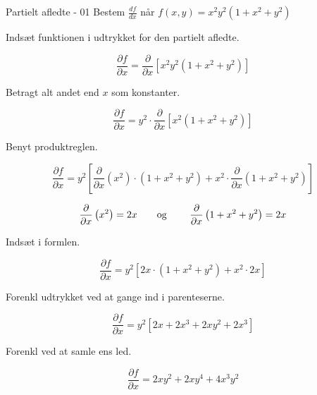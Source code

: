 \documentclass{article}
\begin{document}
\tableofcontents
\newpage

\begin{exercise}{Partielt afledte - 01}
Bestem $\frac{df}{dx}$ når $f(x,y) = x^2y^2\left(1+x^2+y^2\right)$ 


\hint
Indsæt funktionen i udtrykket for den partielt afledte.

\hint

\[
\frac{\partial f}{\partial x} = \frac{\partial }{\partial x} \left[ x^2y^2\left(1+x^2+y^2 \right)\right]
\]

\hint
Betragt alt andet end $x$ som konstanter.

\hint
\[
\frac{\partial f}{\partial x} = y^2 \cdot \frac{\partial }{\partial x} \left[ x^2\left(1+x^2+y^2 \right) \right]
\]

\hint

Benyt produktreglen.

\hint
\[
\frac{\partial f}{\partial x} = y^2\left[\frac{\partial }{\partial x}\left(x^2 \right) \cdot \left( 1+x^2+y^2 \right) + x^2 \cdot \frac{\partial}{\partial x} \left( 1+x^2+y^2\right) \right]
\]

\hint
\[\frac{\partial }{\partial x} \left(x^2\right) = 2x \textrm{\qquad og \qquad} \frac{\partial }{\partial x} \left(1+x^2+y^2\right) = 2x
\]

\hint
Indsæt i formlen.

\hint
\[
\frac{\partial f}{\partial x} = y^2\left[2x \cdot \left( 1+x^2+y^2 \right) + x^2 \cdot 2x \right]
\]

\hint
Forenkl udtrykket ved at gange ind i parenteserne.

\hint
\[
\frac{\partial f}{\partial x} = y^2 \left[ 2x+2x^3+2xy^2 + 2x^3 \right]
\]

\hint Forenkl ved at samle ens led.

\hint
\[
\frac{\partial f}{\partial x} = 2xy^2+2xy^4 + 4x^3y^2
\]

\end{exercise}

\newpage
\end{document}
